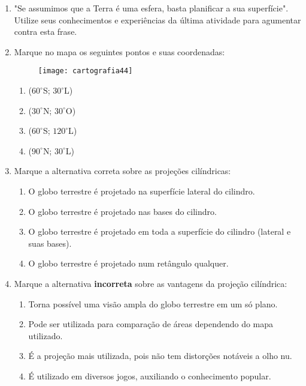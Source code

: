 {\begin{enumerate}
({ }{ }{ }) --- Auxílio no deslocamento, principalmente no tempo das navegações.

({ }{ }{ }) --- Utiliza o mesmo sistema de medida que o plano cartesiano tridimensional

({ }{ }{ }) --- Tem apenas três tipos de projeções: a cônica, a cilíndrica e a plana.

({ }{ }{ }) --- Pode ter distorção de área, mas nunca de formato.

\item "Se assumimos que a Terra é uma esfera, basta planificar a sua superfície". Utilize seus conhecimentos e experiências da última atividade para agumentar contra esta frase.

\item Marque no mapa os seguintes pontos e suas coordenadas:

\begin{figure}[H]
\centering
\texttt{[image: cartografia44]}

\end{figure}

\begin{enumerate}
\item ($60^{\circ}$S; $30^{\circ}$L)
\item ($30^{\circ}$N; $30^{\circ}$O)
\item ($60^{\circ}$S; $120^{\circ}$L)
\item ($90^{\circ}$N; $30^{\circ}$L)
\end{enumerate}

\item Marque a alternativa correta sobre as projeções cilíndricas:
\begin{enumerate}
\item O globo terrestre é projetado na superfície lateral do cilindro.
\item O globo terrestre é projetado nas bases do cilindro.
\item O globo terrestre é projetado em toda a  superfície do cilindro (lateral e suas bases).
\item O globo terrestre é projetado num retângulo qualquer.
\end{enumerate}


\item Marque a alternativa \textbf{incorreta} sobre as vantagens da projeção cilíndrica:
\begin{enumerate}
\item Torna possível uma visão ampla do globo terrestre em um só plano.
\item Pode ser utilizada para comparação de áreas dependendo do mapa utilizado.
\item É a projeção mais utilizada, pois não tem distorções notáveis a olho nu.
\item É utilizado em diversos jogos, auxiliando o conhecimento popular.
\end{enumerate}


\end{enumerate}}
